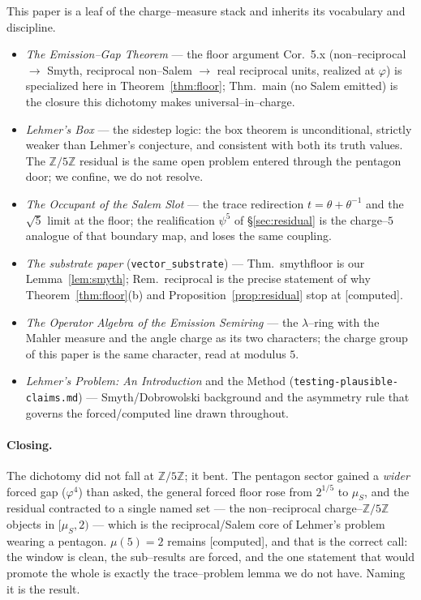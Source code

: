 \documentclass[11pt]{article}
\newcommand{\computed}{\textcolor{ccomp}{\textsf{[computed]}}}
\newcommand{\Z}{\mathbb{Z}}
\newcommand{\muS}{\mu_S}
\newcommand{\Zfive}{\Z/5\Z}
\theoremstyle{plain}
\theoremstyle{definition}
\theoremstyle{remark}
\begin{document}
This paper is a leaf of the charge--measure stack and inherits its vocabulary and discipline.
\begin{itemize}[leftmargin=1.4em,topsep=2pt,itemsep=1pt]
\item \emph{The Emission--Gap Theorem} --- the floor argument Cor.~5.x (non--reciprocal $\to$ Smyth,
reciprocal non--Salem $\to$ real reciprocal units, realized at $\varphi$) is specialized here in
Theorem~\ref{thm:floor}; Thm.~\textup{main} (no Salem emitted) is the closure this dichotomy makes
universal--in--charge.
\item \emph{Lehmer's Box} --- the sidestep logic: the box theorem is unconditional, strictly weaker
than Lehmer's conjecture, and consistent with both its truth values. The $\Zfive$ residual is the
same open problem entered through the pentagon door; we confine, we do not resolve.
\item \emph{The Occupant of the Salem Slot} --- the trace redirection $t=\theta+\theta^{-1}$ and the
$\sqrt5$ limit at the floor; the realification $\psi^5$ of \S\ref{sec:residual} is the charge--$5$
analogue of that boundary map, and loses the same coupling.
\item \emph{The substrate paper} (\texttt{vector\_substrate}) --- Thm.~\textup{smythfloor} is our
Lemma~\ref{lem:smyth}; Rem.~\textup{reciprocal} is the precise statement of why
Theorem~\ref{thm:floor}(b) and Proposition~\ref{prop:residual} stop at \computed{}.
\item \emph{The Operator Algebra of the Emission Semiring} --- the $\lambda$--ring with the Mahler
measure and the angle charge as its two characters; the charge group of this paper is the same
character, read at modulus $5$.
\item \emph{Lehmer's Problem: An Introduction} and the Method (\texttt{testing-plausible-claims.md})
--- Smyth/Dobrowolski background and the asymmetry rule that governs the forced/computed line drawn
throughout.
\end{itemize}

\paragraph{Closing.} The dichotomy did not fall at $\Zfive$; it bent. The pentagon sector gained a
\emph{wider} forced gap ($\varphi^4$) than asked, the general forced floor rose from $2^{1/5}$ to
$\muS$, and the residual contracted to a single named set --- the non--reciprocal charge--$\Zfive$
objects in $[\muS,2)$ --- which is the reciprocal/Salem core of Lehmer's problem wearing a pentagon.
$\mu(5)=2$ remains \computed{}, and that is the correct call: the window is clean, the sub--results
are forced, and the one statement that would promote the whole is exactly the trace--problem lemma we
do not have. Naming it is the result.
\end{document}
